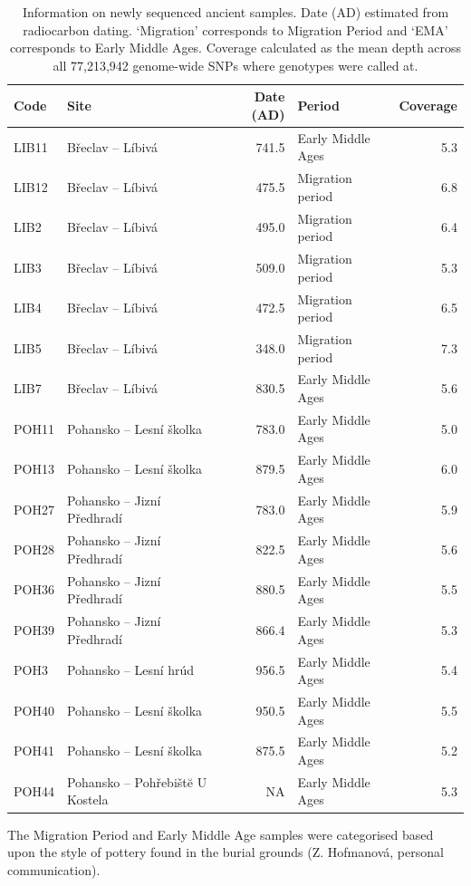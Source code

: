 \begin{table}
\centering
\begin{tabular}[t]{llrlr}
\toprule
Code & Site & Date (AD) & Period & Coverage\\
\midrule
LIB11 & Břeclav – Líbivá & 741.5 & Early Middle Ages & 5.3\\
LIB12 & Břeclav – Líbivá & 475.5 & Migration period & 6.8\\
LIB2 & Břeclav – Líbivá & 495.0 & Migration period & 6.4\\
LIB3 & Břeclav – Líbivá & 509.0 & Migration period & 5.3\\
LIB4 & Břeclav – Líbivá & 472.5 & Migration period & 6.5\\
\addlinespace
LIB5 & Břeclav – Líbivá & 348.0 & Migration period & 7.3\\
LIB7 & Břeclav – Líbivá & 830.5 & Early Middle Ages & 5.6\\
POH11 & Pohansko – Lesní školka & 783.0 & Early Middle Ages & 5.0\\
POH13 & Pohansko – Lesní školka & 879.5 & Early Middle Ages & 6.0\\
POH27 & Pohansko – Jizní Předhradí & 783.0 & Early Middle Ages & 5.9\\
\addlinespace
POH28 & Pohansko – Jizní Předhradí & 822.5 & Early Middle Ages & 5.6\\
POH36 & Pohansko – Jizní Předhradí & 880.5 & Early Middle Ages & 5.5\\
POH39 & Pohansko – Jizní Předhradí & 866.4 & Early Middle Ages & 5.3\\
POH3 & Pohansko – Lesní hrúd & 956.5 & Early Middle Ages & 5.4\\
POH40 & Pohansko – Lesní školka & 950.5 & Early Middle Ages & 5.5\\
\addlinespace
POH41 & Pohansko – Lesní školka & 875.5 & Early Middle Ages & 5.2\\
POH44 & Pohansko – Pohřebištĕ U Kostela & NA & Early Middle Ages & 5.3\\
\bottomrule
\end{tabular}
\caption{Information on newly sequenced ancient samples. Date (AD) estimated from radiocarbon dating. `Migration' corresponds to Migration Period and `EMA' corresponds to Early Middle Ages. Coverage calculated as the mean depth across all 77,213,942 genome-wide SNPs where genotypes were called at.}
\label{tab:AncientSamples}
\end{table}



The Migration Period and Early Middle Age samples were categorised based upon the style of pottery found in the burial grounds (Z. Hofmanová, personal communication).  


